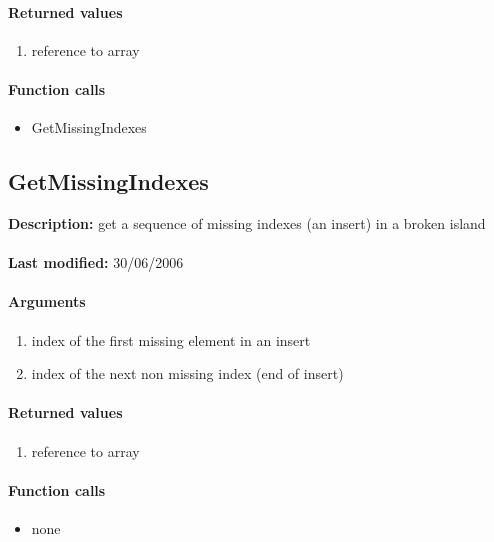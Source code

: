 \paragraph{Returned values}
\begin{enumerate}
\item reference to array
\end{enumerate}

\paragraph{Function calls}
\begin{itemize}
\item GetMissingIndexes
\end{itemize}

\subsection{GetMissingIndexes}
\textbf{Description:} get a sequence of missing indexes (an insert) in a broken island\\
\\\textbf{Last modified:} 30/06/2006

\paragraph{Arguments}
\begin{enumerate}
\item index of the first missing element in an insert
\item index of the next non missing index (end of insert)
\end{enumerate}

\paragraph{Returned values}
\begin{enumerate}
\item reference to array
\end{enumerate}

\paragraph{Function calls}
\begin{itemize}
\item none
\end{itemize}


